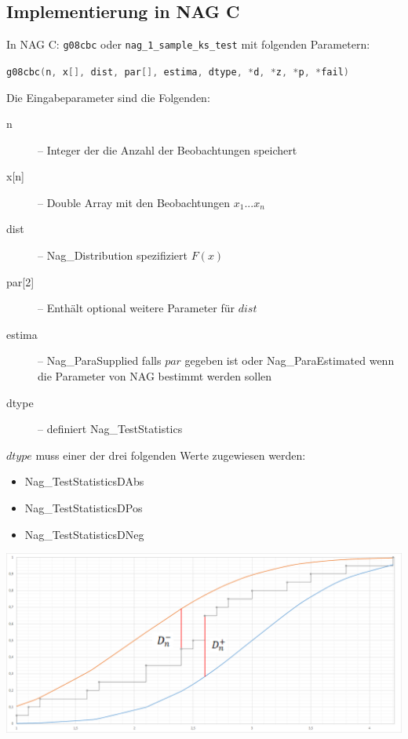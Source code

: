\documentclass{beamer}
\begin{document}
\subsection{Implementierung in NAG C}
\begin{frame}[fragile]{\insertsubsection}
In NAG C: \lstinline[language=C++]$g08cbc$ oder \lstinline[language=C++]$nag_1_sample_ks_test$ mit folgenden Parametern:\\
\begin{center}\lstinline[language=C++]$g08cbc(n, x[], dist, par[], estima, dtype, *d, *z, *p, *fail)$\end{center}
Die Eingabeparameter sind die Folgenden:
	\begin{description}
		\item[n] -- Integer der die Anzahl der Beobachtungen speichert
		\item[x{[n]}] -- Double Array mit den Beobachtungen $x_1...x_n$
		\item[dist] -- Nag\_Distribution spezifiziert $F(x)$
		\item[par{[2]}] -- Enthält optional weitere Parameter für $dist$
		\item[estima] -- Nag\_ParaSupplied falls $par$ gegeben ist oder Nag\_ParaEstimated wenn die Parameter von NAG bestimmt werden sollen
		\item[dtype] -- definiert Nag\_TestStatistics
	\end{description}
\end{frame}

\begin{frame}[fragile]{\insertsubsection}
$dtype$ muss einer der drei folgenden Werte zugewiesen werden:
	\begin{itemize}
		\item Nag\_TestStatisticsDAbs
		\item Nag\_TestStatisticsDPos
		\item Nag\_TestStatisticsDNeg
	\end{itemize}
	\includegraphics[width=1.0\textwidth]{figures/diagramKSd-d+.png}
\end{frame}
\end{document}
